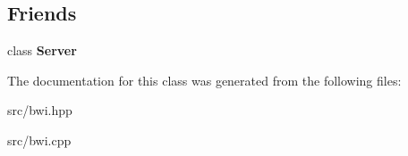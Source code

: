 \subsection*{Friends}
\begin{DoxyCompactItemize}
\item 
class {\bfseries Server}\hypertarget{classRTSim_1_1BWI_ac2055578ac48afabe5af487878450f68}{}\label{classRTSim_1_1BWI_ac2055578ac48afabe5af487878450f68}

\end{DoxyCompactItemize}


The documentation for this class was generated from the following files\+:\begin{DoxyCompactItemize}
\item 
src/bwi.\+hpp\item 
src/bwi.\+cpp\end{DoxyCompactItemize}

